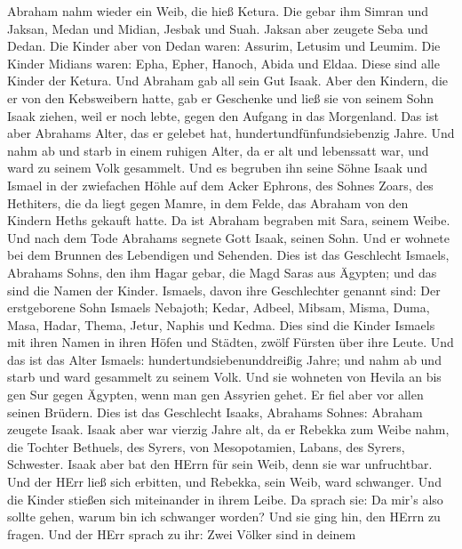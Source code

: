  Abraham nahm wieder ein Weib, die hieß Ketura. 
Die gebar ihm Simran und Jaksan, Medan und Midian, Jesbak und Suah.
 Jaksan aber zeugete Seba und Dedan. Die Kinder aber von
Dedan waren: Assurim, Letusim und Leumim.  Die Kinder
Midians waren: Epha, Epher, Hanoch, Abida und Eldaa. Diese sind alle
Kinder der Ketura.  Und Abraham gab all sein Gut Isaak.
 Aber den Kindern, die er von den Kebsweibern hatte, gab er
Geschenke und ließ sie von seinem Sohn Isaak ziehen, weil er noch lebte,
gegen den Aufgang in das Morgenland.  Das ist aber Abrahams
Alter, das er gelebet hat, hundertundfünfundsiebenzig Jahre.
 Und nahm ab und starb in einem ruhigen Alter, da er alt und
lebenssatt war, und ward zu seinem Volk gesammelt.  Und es
begruben ihn seine Söhne Isaak und Ismael in der zwiefachen Höhle auf
dem Acker Ephrons, des Sohnes Zoars, des Hethiters, die da liegt gegen
Mamre,  in dem Felde, das Abraham von den Kindern Heths
gekauft hatte. Da ist Abraham begraben mit Sara, seinem Weibe.
 Und nach dem Tode Abrahams segnete Gott Isaak, seinen
Sohn. Und er wohnete bei dem Brunnen des Lebendigen und Sehenden.
 Dies ist das Geschlecht Ismaels, Abrahams Sohns, den ihm
Hagar gebar, die Magd Saras aus Ägypten;  und das sind die
Namen der Kinder. Ismaels, davon ihre Geschlechter genannt sind: Der
erstgeborene Sohn Ismaels Nebajoth; Kedar, Adbeel, Mibsam, 
Misma, Duma, Masa,  Hadar, Thema, Jetur, Naphis und Kedma.
 Dies sind die Kinder Ismaels mit ihren Namen in ihren
Höfen und Städten, zwölf Fürsten über ihre Leute.  Und das
ist das Alter Ismaels: hundertundsiebenunddreißig Jahre; und nahm ab und
starb und ward gesammelt zu seinem Volk.  Und sie wohneten
von Hevila an bis gen Sur gegen Ägypten, wenn man gen Assyrien gehet. Er
fiel aber vor allen seinen Brüdern.  Dies ist das
Geschlecht Isaaks, Abrahams Sohnes: Abraham zeugete Isaak. 
Isaak aber war vierzig Jahre alt, da er Rebekka zum Weibe nahm, die
Tochter Bethuels, des Syrers, von Mesopotamien, Labans, des Syrers,
Schwester.  Isaak aber bat den HErrn für sein Weib, denn
sie war unfruchtbar. Und der HErr ließ sich erbitten, und Rebekka, sein
Weib, ward schwanger.  Und die Kinder stießen sich
miteinander in ihrem Leibe. Da sprach sie: Da mir's also sollte gehen,
warum bin ich schwanger worden? Und sie ging hin, den HErrn zu fragen.
 Und der HErr sprach zu ihr: Zwei Völker sind in deinem
